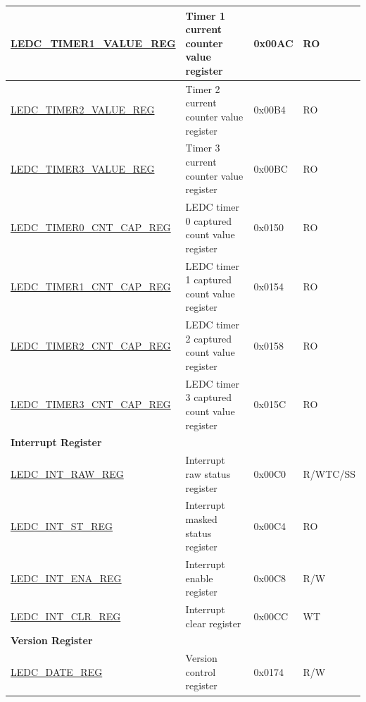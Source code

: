 \begin{longtable}{ | p{5.5cm} | p{6.8cm} | p{1.3cm} | p{2cm}| }
\hyperref[regdesc:LEDCTIMERNVALUEREG]{LEDC\_TIMER1\_VALUE\_REG} & Timer 1 current counter value register & 0x00AC & RO \\ \hline
\hyperref[regdesc:LEDCTIMERNVALUEREG]{LEDC\_TIMER2\_VALUE\_REG} & Timer 2 current counter value register & 0x00B4 & RO \\ \hline
\hyperref[regdesc:LEDCTIMERNVALUEREG]{LEDC\_TIMER3\_VALUE\_REG} & Timer 3 current counter value register & 0x00BC & RO \\ \hline
\hyperref[regdesc:LEDCTIMERNCNTCAPREG]{LEDC\_TIMER0\_CNT\_CAP\_REG} & LEDC timer 0 captured count value register & 0x0150 & RO \\ \hline
\hyperref[regdesc:LEDCTIMERNCNTCAPREG]{LEDC\_TIMER1\_CNT\_CAP\_REG} & LEDC timer 1 captured count value register & 0x0154 & RO \\ \hline
\hyperref[regdesc:LEDCTIMERNCNTCAPREG]{LEDC\_TIMER2\_CNT\_CAP\_REG} & LEDC timer 2 captured count value register & 0x0158 & RO \\ \hline
\hyperref[regdesc:LEDCTIMERNCNTCAPREG]{LEDC\_TIMER3\_CNT\_CAP\_REG} & LEDC timer 3 captured count value register & 0x015C & RO \\ \hline
\multicolumn{4}{|l|}{\textbf{Interrupt Register}} \\ \hline
\hyperref[regdesc:LEDCINTRAWREG]{LEDC\_INT\_RAW\_REG} & Interrupt raw status register & 0x00C0 & R/WTC/SS \\ \hline
\hyperref[regdesc:LEDCINTSTREG]{LEDC\_INT\_ST\_REG} & Interrupt masked status register & 0x00C4 & RO \\ \hline
\hyperref[regdesc:LEDCINTENAREG]{LEDC\_INT\_ENA\_REG} & Interrupt enable register & 0x00C8 & R/W \\ \hline
\hyperref[regdesc:LEDCINTCLRREG]{LEDC\_INT\_CLR\_REG} & Interrupt clear register & 0x00CC & WT \\ \hline
\multicolumn{4}{|l|}{\textbf{Version Register}} \\ \hline
\hyperref[regdesc:LEDCDATEREG]{LEDC\_DATE\_REG} & Version control register & 0x0174 & R/W \\ \hline
\end{longtable}
